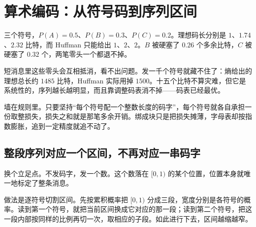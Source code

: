 \section{算术编码：从符号码到序列区间}
\label{sec:07-Information-Theory/04-Source-Coding/03}

三个符号，\(P(A)=0.5\)、\(P(B)=0.3\)、\(P(C)=0.2\)。理想码长分别是 \(1\)、\(1.74\)、\(2.32\) 比特，而 Huffman 只能给出 \(1\)、\(2\)、\(2\)。\(B\) 被硬塞了 \(0.26\) 个多余比特，\(C\) 被硬塞了 \(0.32\) 个，两笔零头一个都退不掉。

短消息里这些零头会互相抵消，看不出问题。发一千个符号就藏不住了：熵给出的理想总长约 \(1485\) 比特，Huffman 实际用掉 \(1500\)。十五个比特不算灾难，但它是系统性的，序列越长越明显，而且靠调整码表消不掉——码表已经最优。

墙在规则里。只要坚持``每个符号配一个整数长度的码字''，每个符号就各自承担一份取整损失，损失之和就是那笔多余开销。绑成块只是把损失摊薄，字母表却按指数膨胀，追到一定精度就追不动了。

\subsection{整段序列对应一个区间，不再对应一串码字}

换个立足点。不发码字，发一个数。这个数落在 \([0,1)\) 的某个位置，位置本身就唯一地标定了整条消息。

做法是逐符号切割区间。先按累积概率把 \([0,1)\) 分成三段，宽度分别是各符号的概率。读到第一个符号，就把当前区间换成它对应的那一段；读到第二个符号，把这一段内部按同样的比例再切一次，取相应的子段。如此进行下去，区间越缩越窄。


